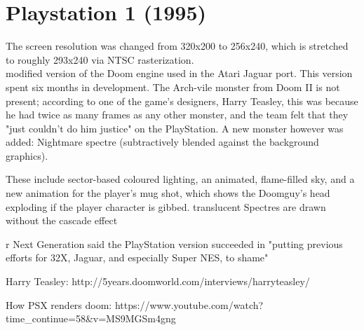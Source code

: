 \section{Playstation 1 (1995)}
The screen resolution was changed from 320x200 to 256x240, which is stretched to roughly 293x240 via NTSC rasterization.\\
modified version of the Doom engine used in the Atari Jaguar port. This version spent six months in development. The Arch-vile monster from Doom II is not present; according to one of the game's designers, Harry Teasley, this was because he had twice as many frames as any other monster, and the team felt that they "just couldn't do him justice" on the PlayStation. A new monster however was added: Nightmare spectre (subtractively blended against the background graphics).\\
\par
 These include sector-based coloured lighting, an animated, flame-filled sky, and a new animation for the player's mug shot, which shows the Doomguy's head exploding if the player character is gibbed. translucent Spectres are drawn without the cascade effect \\
\par
r Next Generation said the PlayStation version succeeded in "putting previous efforts for 32X, Jaguar, and especially Super NES, to shame" 
\par
Harry Teasley: http://5years.doomworld.com/interviews/harryteasley/\\
\par
{}
How PSX renders doom: https://www.youtube.com/watch?time\_continue=58\&v=MS9MGSm4gng\\
\par











